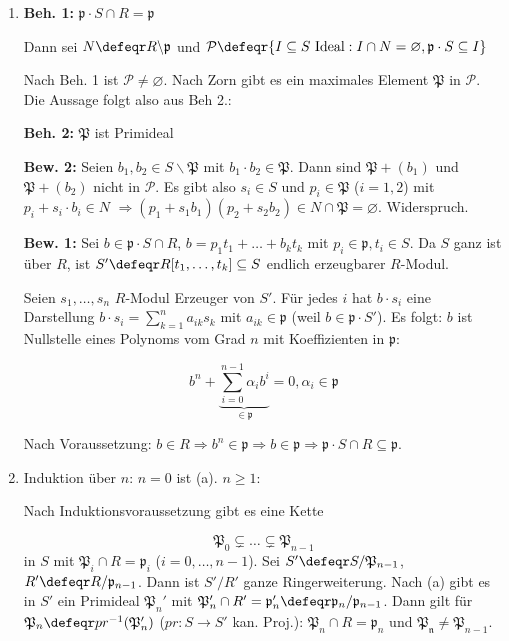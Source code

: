 \begin{Bew}
\begin{enumerate}
\item \textbf{Beh. 1: } $\mathfrak{p}\cdot S \cap R =\mathfrak{p}$

Dann sei $N\defeqr R\backslash\mathfrak{p}$ und $\mathcal{P}\defeqr
\{I\subseteq S\ \text{Ideal}: I\cap N=\varnothing, \mathfrak{p}\cdot S \subseteq I\}$

Nach Beh. 1 ist $\mathcal{P}\neq \varnothing$. Nach Zorn gibt es ein maximales Element
$\mathfrak{P}$ in $\mathcal{P}$. Die Aussage folgt also aus Beh 2.:

\textbf{Beh. 2: } $\mathfrak{P}$ ist Primideal

\textbf{Bew. 2: } Seien $b_1, b_2\in S\backslash \mathfrak{P}$ mit $b_1\cdot b_2\in \mathfrak{P}$.
Dann sind $\mathfrak{P}+(b_1)$ und $\mathfrak{P}+(b_2)$ nicht in $\mathcal{P}$. Es gibt
also $s_i\in S$ und $p_i\in \mathfrak{P}$ ($i=1,2$) mit $p_i+s_i\cdot b_i\in N$
$\Rightarrow (p_1+s_1b_1)(p_2+s_2b_2)\in N\cap \mathfrak{P}=\varnothing$. Widerspruch.

\textbf{Bew. 1: } Sei $b\in \mathfrak{p}\cdot S\cap R$, $b=p_1t_1+\ldots+b_k t_k$ mit 
$p_i\in \mathfrak{p}, t_i\in S$. Da $S$ ganz ist \"uber $R$, ist 
$S'\defeqr R[t_1, \ldots, t_k]\subseteq S$ endlich erzeugbarer $R$-Modul.

Seien $s_1,\ldots, s_n$ $R$-Modul Erzeuger von $S'$. F\"ur jedes $i$ hat $b\cdot s_i$ eine
Darstellung $b\cdot s_i=\sum_{k=1}^{n}a_{ik}s_k$ mit $a_{ik}\in \mathfrak{p}$
(weil $b\in \mathfrak{p}\cdot S'$). Es folgt: $b$ ist Nullstelle eines Polynoms
vom Grad $n$ mit Koeffizienten in $\mathfrak{p}$: 

$$b^n+ \underbrace{\sum_{i=0}^{n-1}\alpha_i b^i}_{\in \mathfrak{p}}=0, \alpha_i\in \mathfrak{p}$$

Nach Voraussetzung: $b\in R\Rightarrow b^n\in \mathfrak{p}\Rightarrow b\in \mathfrak{p}
\Rightarrow \mathfrak{p}\cdot S \cap R\subseteq \mathfrak{p}$.

\item Induktion \"uber $n$: $n=0$ ist (a). $n\geq 1$:

Nach Induktionsvoraussetzung gibt es eine Kette

$$\mathfrak{P}_0\subsetneq\ldots\subsetneq\mathfrak{P}_{n-1}$$ 
in $S$ mit $\mathfrak{P}_i\cap R=\mathfrak{p}_i$ ($i=0,\ldots, n-1$). Sei
$S'\defeqr S/\mathfrak{P}_{n-1}$, $R'\defeqr R/\mathfrak{p}_{n-1}$. Dann 
ist $S'/R'$ ganze Ringerweiterung. Nach (a) gibt es in $S'$ ein Primideal $\mathfrak{P}_{n}'$
mit $\mathfrak{P}_n'\cap R'=\mathfrak{p}_n'\defeqr \mathfrak{p}_n/\mathfrak{p}_{n-1}$.
Dann gilt f\"ur $\mathfrak{P}_n\defeqr pr^{-1}(\mathfrak{P}_n')$ ($pr:S\to S'$ kan. Proj.):
$\mathfrak{P}_n\cap R=\mathfrak{p}_n$ und $\mathfrak{P_n}\neq\mathfrak{P}_{n-1}$.


\end{enumerate}
\end{Bew}
